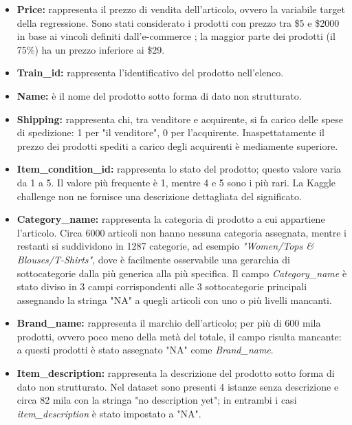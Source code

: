 \begin{itemize}

\itemsep0em 
\item \textbf{Price:} rappresenta il prezzo di vendita dell'articolo, ovvero la
variabile target della regressione. Sono stati considerato i prodotti con prezzo tra \$5 e
\$2000 in base ai vincoli definiti dall'e-commerce
\cite{mercari-how-to-set-a-price}; la maggior parte dei prodotti (il 75\%) ha un
prezzo inferiore ai \$29.

\item \textbf{Train\_id:} rappresenta l'identificativo del prodotto nell'elenco.

\item \textbf{Name:} è il nome del prodotto sotto forma di dato non strutturato.

\item \textbf{Shipping:} rappresenta chi, tra venditore e acquirente, si fa
carico delle spese di spedizione: 1 per "il venditore", 0 per l'acquirente.
Inaspettatamente il prezzo dei prodotti spediti a carico degli
acquirenti è mediamente superiore.

\item \textbf{Item\_condition\_id:} rappresenta lo stato del prodotto; questo valore
varia da 1 a 5. Il valore più frequente è 1, mentre 4 e 5 sono i più rari. La
Kaggle challenge non ne fornisce una descrizione dettagliata del significato.

\item \textbf{Category\_name:} rappresenta la categoria di prodotto a cui appartiene
l'articolo.
Circa 6000 articoli non hanno nessuna categoria assegnata, mentre i restanti
si suddividono in 1287 categorie, ad esempio \textit{"Women/Tops \&
Blouses/T-Shirts"}, dove è facilmente osservabile una gerarchia di
sottocategorie dalla più generica alla più specifica. Il campo
\textit{Category\_name} è stato diviso in 3 campi corrispondenti alle 3
sottocategorie principali assegnando la stringa "NA" a quegli articoli con uno o
più livelli mancanti.

\item \textbf{Brand\_name:} rappresenta il marchio dell'articolo; per più di 600
mila prodotti, ovvero poco meno della metà del totale, il campo risulta
mancante: a questi prodotti è stato assegnato "NA" come \textit{Brand\_name}.

\item \textbf{Item\_description:} rappresenta la descrizione del prodotto sotto forma
di dato non strutturato.
Nel dataset sono presenti 4 istanze senza descrizione e
circa 82 mila con la stringa "no description yet"; in entrambi i casi
\textit{item\_description} è stato impostato a "NA".


\end{itemize}
